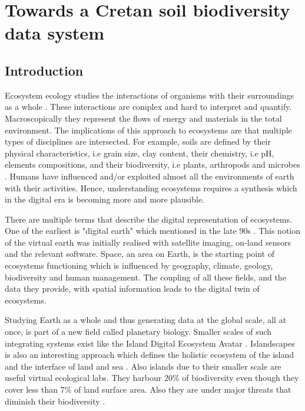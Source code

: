 % 
% 


\chapter{Towards a Cretan soil biodiversity data system}
\label{cha:crete-idea}

\section{Introduction}\label{intro_idea}

Ecosystem ecology studies the interactions of organisms with their surroundings
as a whole \parencite{van-dyne1966ecosystems}. These interactions are complex and hard to interpret and quantify.
Macroscopically they represent the flows of energy and materials in the total environment.
The implications of this approach to ecosystems are that multiple types of disciplines 
are intersected. For example, soils are defined by their physical characteristics,
i.e grain size, clay content, their chemistry, i.e pH, elements compositions, and 
their biodiversity, i.e plants, arthropods and microbes \parencite{vogel2022}. Humans have influenced 
and/or exploited almost all the environments of earth with their activities.
Hence, understanding ecosystems requires a synthesis which in the digital era 
is becoming more and more plausible. 

There are multiple terms that describe the digital representation of ecosystems.
One of the earliest is "digital earth" which mentioned in the late 90s \parencite{Goodchild_2012}.
This notion of the virtual earth was initially realised with satellite imaging,
on-land sensors and the relevant software. Space, an area on Earth, is
the starting point of ecosystems functioning which is influenced by geography,
climate, geology, biodiversity and human management. The coupling of all these
fields, and the data they provide, with spatial information leads to the digital twin of ecosystems.

Studying Earth as a whole and thus generating data at the global scale, all at once,
is part of a new field called planetary biology. Smaller scales of such integrating systems exist like
the Island Digital Ecosystem Avatar \parencite{Davies2016}. Islandscapes 
is also an interesting approach which defines the holistic ecosystem of the island
and the interface of land and sea \parencite{Vogiatzakis_land_2017}. Also islands
due to their smaller scale are useful virtual ecological labs. They harbour 20\% of 
biodiversity even though they cover less than 7\% of land surface area. Also they are under major threats 
that diminish their biodiversity \parencite{fernandez-palacios2021scientists}.


